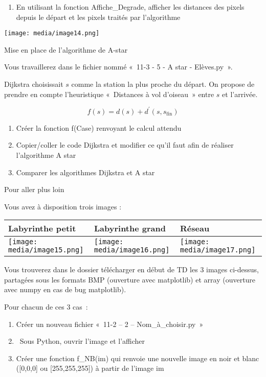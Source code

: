 \documentclass[
]{article}
\begin{document}
\begin{enumerate}
\def\labelenumi{\arabic{enumi}.}
\setcounter{enumi}{3}
\item
  En utilisant la fonction Affiche\_Degrade, afficher les distances des
  pixels depuis le départ et les pixels traités par l'algorithme
\end{enumerate}

\texttt{[image: media/image14.png]}

Mise en place de l'algorithme de A-star

Vous travaillerez dans le fichier nommé «~11-3 - 5 - A star -
Elèves.py~».

Dijkstra choisissait \(s\) comme la station la plus proche du départ. On
propose de prendre en compte l'heuristique «~Distances à vol d'oiseau~»
entre \(s\) et l'arrivée.

\[f\left( s \right) = d\left( s \right) + d^{'}\left( s,s_{\text{fin}} \right)\]

\begin{enumerate}
\def\labelenumi{\arabic{enumi}.}
\setcounter{enumi}{4}
\item
  Créer la fonction f(Case) renvoyant le calcul attendu
\item
  Copier/coller le code Dijkstra et modifier ce qu'il faut afin de
  réaliser l'algorithme A star
\item
  Comparer les algorithmes Dijkstra et A star
\end{enumerate}

Pour aller plus loin

Vous avez à disposition trois images :

\begin{longtable}[]{@{}lll@{}}
\toprule
Labyrinthe petit & Labyrinthe grand & Réseau\tabularnewline
\midrule
\endhead
\texttt{[image: media/image15.png]} &
\texttt{[image: media/image16.png]} &
\texttt{[image: media/image17.png]}\tabularnewline
\bottomrule
\end{longtable}

Vous trouverez dans le dossier télécharger en début de TD les 3 images
ci-dessus, partagées sous les formats BMP (ouverture avec matplotlib) et
array (ouverture avec numpy en cas de bug matplotlib).

Pour chacun de ces 3 cas~:

\begin{enumerate}
\def\labelenumi{\arabic{enumi}.}
\setcounter{enumi}{7}
\item
  Créer un nouveau fichier «~11-2 -- 2 -- Nom\_à\_choisir.py~»
\item
  ~Sous Python, ouvrir l'image et l'afficher
\item
  Créer une fonction f\_NB(im) qui renvoie une nouvelle image en noir et
  blanc ({[}0,0,0{]} ou {[}255,255,255{]}) à partir de l'image im
\end{enumerate}
\end{document}
